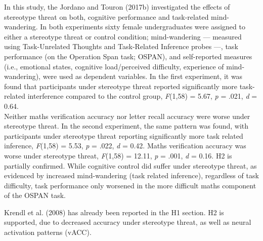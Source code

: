 \documentclass[
  stu, a4paper, 12pt,mask,floatsintext]{apa7}
\begin{document}
In this study, the Jordano and Touron (2017b) investigated the effects of stereotype threat on both, cognitive performance and task-related mind-wandering.
In both experiments sixty female undergraduates were assigned to either a stereotype threat or control condition; mind-wandering --- measured using Task-Unrelated Thoughts and Task-Related Inference probes ---, task performance (on the Operation Span task; OSPAN), and self-reported measures (i.e., emotional states, cognitive load/perceived difficulty, experience of mind-wandering), were used as dependent variables.
In the first experiment, it was found that participants under stereotype threat reported significantly more task-related interference compared to the control group, \emph{F}(1,58) = 5.67, \emph{p} = .021, \emph{d} = 0.64.\\
Neither maths verification accuracy nor letter recall accuracy were worse under stereotype threat.
In the second experiment, the same pattern was found, with participants under stereotype threat reporting significantly more task related inference, \emph{F}(1,58) = 5.53, \emph{p} = .022, \emph{d} = 0.42.
Maths verification accuracy was worse under stereotype threat, \emph{F}(1,58) = 12.11, \emph{p} = .001, \emph{d} = 0.16.
H2 is partially confirmed. While cognitive control did suffer under stereotype threat, as evidenced by increased mind-wandering (task related inference), regardless of task difficulty, task performance only worsened in the more difficult maths component of the OSPAN task.

Krendl et al. (2008) has already been reported in the H1 section.
H2 is supported, due to decreased accuracy under stereotype threat, as well as neural activation patterns (vACC).
\end{document}
